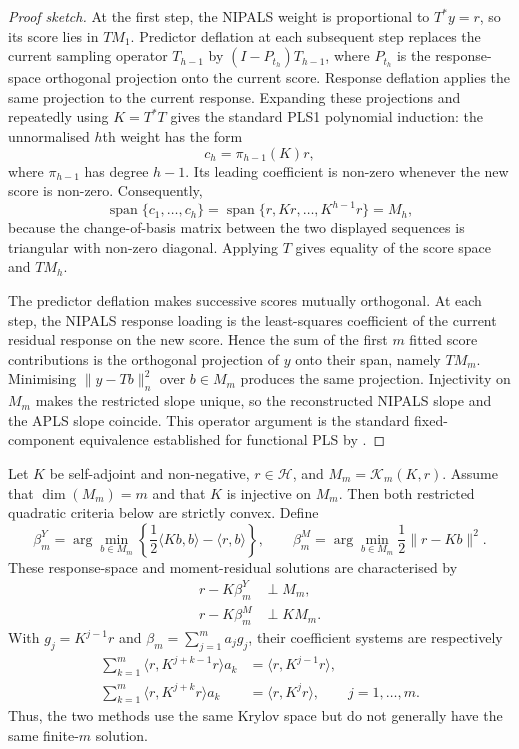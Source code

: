\begin{proof}[Proof sketch]
At the first step, the NIPALS weight is proportional to
$T^*y=r$, so its score lies in $TM_1$.  Predictor deflation at each subsequent
step replaces the current sampling operator $T_{h-1}$ by
$(I-P_{t_h})T_{h-1}$, where $P_{t_h}$ is the response-space orthogonal
projection onto the current score.  Response deflation applies the same
projection to the current response.  Expanding these projections and
repeatedly using $K=T^*T$ gives the standard PLS1 polynomial induction: the
unnormalised $h$th weight has the form
\[
    c_h=\pi_{h-1}(K)r,
\]
where $\pi_{h-1}$ has degree $h-1$.  Its leading coefficient is non-zero
whenever the new score is non-zero.  Consequently,
\[
 \operatorname{span}\{c_1,\ldots,c_h\}
 =\operatorname{span}\{r,Kr,\ldots,K^{h-1}r\}=M_h,
\]
because the change-of-basis matrix between the two displayed sequences is
triangular with non-zero diagonal.  Applying $T$ gives equality of the score
space and $TM_h$.

The predictor deflation makes successive scores mutually orthogonal.  At
each step, the NIPALS response loading is the least-squares coefficient of the
current residual response on the new score.  Hence the sum of the first $m$
fitted score contributions is the orthogonal projection of $y$ onto their
span, namely $TM_m$.  Minimising $\|y-Tb\|_n^2$ over $b\in M_m$ produces the
same projection.  Injectivity on $M_m$ makes the restricted slope unique, so
the reconstructed NIPALS slope and the APLS slope coincide.  This operator
argument is the standard fixed-component equivalence established for
functional PLS by \textcite{delaigle_hall_2012}.
\end{proof}

\begin{proposition}
\label{prop:app-response-moment-krylov}
Let $K$ be self-adjoint and non-negative, $r\in\mathcal H$, and
$M_m=\mathcal K_m(K,r)$.  Assume that $\dim(M_m)=m$ and that $K$ is
injective on $M_m$.  Then both restricted quadratic criteria below are
strictly convex.  Define
\[
 \beta_m^Y
 =\arg\min_{b\in M_m}
   \left\{\frac12\langle Kb,b\rangle-\langle r,b\rangle\right\},
 \qquad
 \beta_m^M
 =\arg\min_{b\in M_m}\frac12\|r-Kb\|^2.
\]
These response-space and moment-residual solutions are characterised by
\begin{align*}
    r-K\beta_m^Y&\perp M_m,\\
    r-K\beta_m^M&\perp KM_m.
\end{align*}
With $g_j=K^{j-1}r$ and
$\beta_m=\sum_{j=1}^{m}a_jg_j$, their coefficient systems are respectively
\begin{align*}
 \sum_{k=1}^{m}\langle r,K^{j+k-1}r\rangle a_k
 &=\langle r,K^{j-1}r\rangle,\\
 \sum_{k=1}^{m}\langle r,K^{j+k}r\rangle a_k
 &=\langle r,K^jr\rangle,
 \qquad j=1,\ldots,m.
\end{align*}
Thus, the two methods use the same Krylov space but do not generally have the
same finite-$m$ solution.
\end{proposition}

